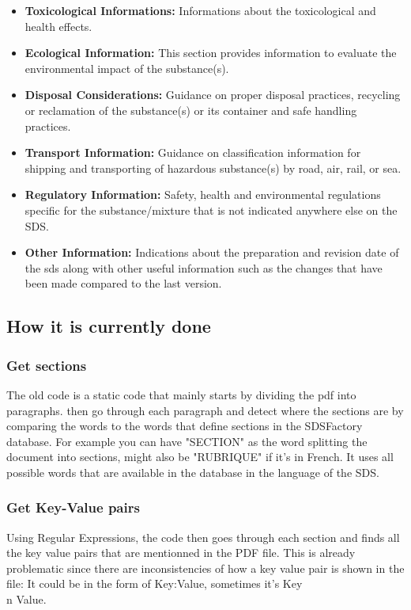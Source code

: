 \documentclass[a4paper,12pt,twoside]{report}
\begin{document}
\begin{itemize}
\item \textbf{Toxicological Informations:} Informations about the toxicological and health effects.
\item \textbf{Ecological Information:} This section provides information to evaluate the environmental impact of the substance(s).
\item \textbf{Disposal Considerations:} Guidance on proper disposal practices, recycling or reclamation of the substance(s) or its container and safe handling practices.
\item \textbf{Transport Information:} Guidance on classification information for shipping and transporting of hazardous substance(s) by road, air, rail, or sea.
\item \textbf{Regulatory Information:} Safety, health and environmental regulations specific for the substance/mixture that is not indicated anywhere else on the SDS.
\item \textbf{Other Information:} Indications about the preparation and revision date of the sds along with other useful information such as the changes that have been made compared to the last version. 
\end{itemize}
\subsection{How it is currently done}

\subsubsection{Get sections}
The old code is a static code that mainly starts by dividing the pdf into paragraphs. then go through each paragraph and detect where the sections are by comparing the words to the words that define sections in the SDSFactory database. For example you can have "SECTION" as the word splitting the document into sections, might also be "RUBRIQUE" if it's in French. It uses all possible words that are available in the database in the language of the SDS.
\subsubsection{Get Key-Value pairs}
Using Regular Expressions, the code then goes through each section and finds all the key value pairs that are mentionned in the PDF file. This is already problematic since there are inconsistencies of how a key value pair is shown in the file: It could be in the form of Key:Value, sometimes it's Key \\n Value.
\end{document}
